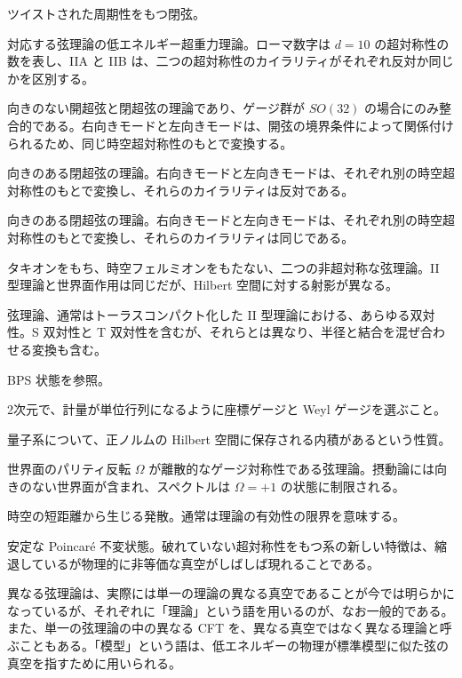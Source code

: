 {ツイストされた周期性をもつ閉弦。}

{対応する弦理論の低エネルギー超重力理論。ローマ数字は $d=10$ の超対称性の数を表し、IIA と IIB は、二つの超対称性のカイラリティがそれぞれ反対か同じかを区別する。}

{向きのない開超弦と閉超弦の理論であり、ゲージ群が $SO(32)$ の場合にのみ整合的である。右向きモードと左向きモードは、開弦の境界条件によって関係付けられるため、同じ時空超対称性のもとで変換する。}

{向きのある閉超弦の理論。右向きモードと左向きモードは、それぞれ別の時空超対称性のもとで変換し、それらのカイラリティは反対である。}

{向きのある閉超弦の理論。右向きモードと左向きモードは、それぞれ別の時空超対称性のもとで変換し、それらのカイラリティは同じである。}

{タキオンをもち、時空フェルミオンをもたない、二つの非超対称な弦理論。II 型理論と世界面作用は同じだが、Hilbert 空間に対する射影が異なる。}

{弦理論、通常はトーラスコンパクト化した II 型理論における、あらゆる双対性。S 双対性と T 双対性を含むが、それらとは異なり、半径と結合を混ぜ合わせる変換も含む。}

{BPS 状態を参照。}

{2次元で、計量が単位行列になるように座標ゲージと Weyl ゲージを選ぶこと。}

{量子系について、正ノルムの Hilbert 空間に保存される内積があるという性質。}

{世界面のパリティ反転 $\Omega$ が離散的なゲージ対称性である弦理論。摂動論には向きのない世界面が含まれ、スペクトルは $\Omega=+1$ の状態に制限される。}

{時空の短距離から生じる発散。通常は理論の有効性の限界を意味する。}

{安定な Poincaré 不変状態。破れていない超対称性をもつ系の新しい特徴は、縮退しているが物理的に非等価な真空がしばしば現れることである。\par
異なる弦理論は、実際には単一の理論の異なる真空であることが今では明らかになっているが、それぞれに「理論」という語を用いるのが、なお一般的である。また、単一の弦理論の中の異なる CFT を、異なる真空ではなく異なる理論と呼ぶこともある。「模型」という語は、低エネルギーの物理が標準模型に似た弦の真空を指すために用いられる。}

